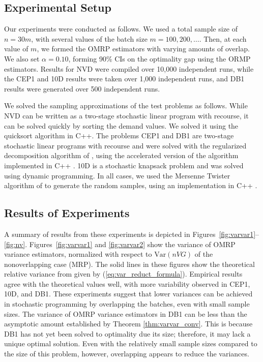 \documentclass[12pt]{article}
\newcommand{\var}[1]{\mathrm{Var} \left( #1 \right)}
\begin{document}
\subsection{Experimental Setup}
\label{ssec:expS}


Our experiments were conducted as follows. 
We used a total sample size of $n = 30 m$, with several values of the batch size $m=100, 200, \ldots$. 
Then, at each value of $m$, we formed the OMRP estimators with varying amounts of overlap. 
We also set $\alpha=0.10$, forming 90\% CIs on the optimality gap using the ORMP estimators. 
Results for NVD were compiled over 10,000 independent runs, while the CEP1 and 10D results were taken over 1,000 independent runs, and DB1 results were generated over 500 independent runs.

We solved the sampling approximations of the test problems as follows.
While NVD can be written as a two-stage stochastic linear program with recourse, it can be solved quickly by sorting the demand values. 
We solved it using the quicksort algorithm in C++. 
The problems CEP1 and DB1 are two-stage stochastic linear programs with recourse and were solved with the regularized decomposition algorithm of \citet{ruszczynski1986regularized}, using the accelerated version of the algorithm implemented in C++ \citep{ruszczynski1997accelerating}. 
10D is a stochastic knapsack problem and was solved using dynamic programming.  
In all cases, we used the Mersenne Twister algorithm of \citet{matsumoto_nishimura_98} to generate the random samples, using an implementation in C++ \citep{wagner_twister_09}.




\subsection{Results of Experiments}
\label{ssec:results}

A summary of results from these experiments is depicted in Figures~\ref{fig:varvar1}--\ref{fig:nv}.
Figures~\ref{fig:varvar1} and \ref{fig:varvar2} show the variance of OMRP variance estimators, normalized with respect to $\var{nVG}$ of the nonoverlapping case (MRP). 
The solid lines in these figures show the theoretical relative variance from \citep{Welch1987} given by (\ref{eq:var_reduct_formula}). 
Empirical results agree with the theoretical values well, with more variability observed in CEP1, 10D, and DB1. 
These experiments suggest that lower variances can be achieved in stochastic programming by overlapping the batches, even with small sample sizes.
The variance of OMRP variance estimators in DB1 can be less than the asymptotic amount established by Theorem \ref{thm:varvar_conv}. %
This is because DB1 has not yet been solved to optimality due its size; therefore, it may lack a unique optimal solution. 
Even with the relatively small sample sizes compared to the size of this problem, however, overlapping appears to reduce the variances. 
\end{document}
